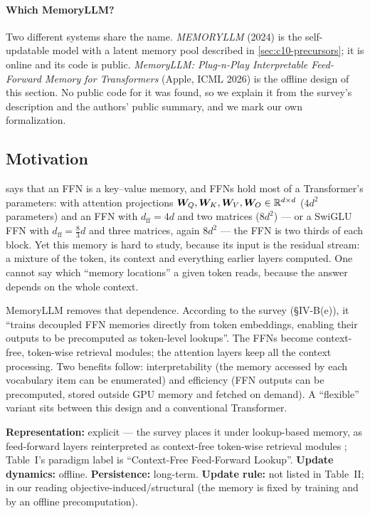 \paragraph{Which MemoryLLM?} Two different systems share the name. \emph{MEMORYLLM}
\citep{wang2024memoryllm} (2024) is the self-updatable model with a latent memory pool described in
\cref{sec:c10-precursors}; it is online and its code is public. \emph{MemoryLLM: Plug-n-Play
Interpretable Feed-Forward Memory for Transformers} \citep{jaiswal2026memoryllm} (Apple, ICML 2026)
is the offline design of this section. No public code for it was found, so we explain it from the
survey's description and the authors' public summary, and we mark our own formalization.

\subsection{Motivation}

 says that an FFN is a key--value memory, and FFNs hold most of a Transformer's
parameters: with attention projections $\bm{W}_Q,\bm{W}_K,\bm{W}_V,\bm{W}_O \in \mathbb{R}^{d\times d}$ ($4d^2$
parameters) and an FFN with $d_{\mathrm{ff}} = 4d$ and two matrices ($8d^2$) --- or a SwiGLU FFN
with $d_{\mathrm{ff}} = \tfrac{8}{3}d$ and three matrices, again $8d^2$ --- the FFN is two thirds of
each block. Yet this memory is hard to study, because its input is the residual stream: a mixture
of the token, its context and everything earlier layers computed. One cannot say which ``memory
locations'' a given token reads, because the answer depends on the whole context.

MemoryLLM removes that dependence. According to the survey (\S IV-B(e)), it ``trains decoupled FFN
memories directly from token embeddings, enabling their outputs to be precomputed as token-level
lookups''. The FFNs become context-free, token-wise retrieval modules; the attention layers keep
all the context processing. Two benefits follow: interpretability (the memory accessed by each
vocabulary item can be enumerated) and efficiency (FFN outputs can be precomputed, stored outside
GPU memory and fetched on demand). A ``flexible'' variant sits between this design and a
conventional Transformer.

\begin{taxonomy}
\textbf{Representation:} explicit --- the survey places it under lookup-based memory, as feed-forward
layers reinterpreted as context-free token-wise retrieval modules \citep[\S IV-B(e)]{zhoubian2026memory};
Table~I's paradigm label is ``Context-Free Feed-Forward Lookup''.
\textbf{Update dynamics:} offline. \textbf{Persistence:} long-term.
\textbf{Update rule:} not listed in Table~II; in our reading objective-induced/structural (the
memory is fixed by training and by an offline precomputation).
\end{taxonomy}

